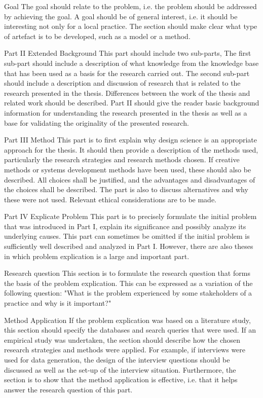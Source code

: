 {Goal
The goal should relate to the
problem, i.e. the problem should be addressed by achieving the goal.
A goal should be of general interest, i.e. it should be interesting not
only for a local practice. The section should make clear what type of
artefact is to be developed, such as a model or a method.

Part II Extended Background
This part should include two sub-parts, The first sub-part should
include a description of what knowledge from the knowledge base
that has been used as a basis for the research carried out. The second
sub-part should include a description and discussion of research
that is related to the research presented in the thesis. Differences
between the work of the thesis and related work should be
described. Part II should give the reader basic background information
for understanding the research presented in the thesis as
well as a base for validating the originality of the presented research.

Part III Method
This part is to first explain why design science is an appropriate approach
for the thesis. It should then provide a description of the
methods used, particularly the research strategies and research
methods chosen. If creative methods or systems development methods
have been used, these should also be described. All choices shall
be justified, and the advantages and disadvantages of the choices
shall be described. The part is also to discuss alternatives and why
these were not used. Relevant ethical considerations are to be made.

Part IV Explicate Problem
This part is to precisely formulate the initial problem that was introduced
in Part I, explain its significance and possibly analyze its underlying
causes. This part can sometimes be omitted if the initial
problem is sufficiently well described and analyzed in Part I. However,
there are also theses in which problem explication is a large and
important part.

Research question
This section is to formulate the research question that forms the
basis of the problem explication. This can be expressed as a variation
of the following question: "What is the problem experienced by some
stakeholders of a practice and why is it important?"

Method Application
If the problem explication was based on a literature study, this section
should specify the databases and search queries that were used.
If an empirical study was undertaken, the section should describe
how the chosen research strategies and methods were applied. For
example, if interviews were used for data generation, the design of
the interview questions should be discussed as well as the set-up of
the interview situation. Furthermore, the section is to show that the
method application is effective, i.e. that it helps answer the research
question of this part.

}
